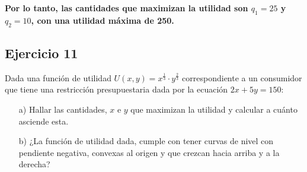 \documentclass{article}
\begin{document}
\textbf{\color{teal}Por lo tanto, las cantidades que maximizan la utilidad son \(q_1 = 25\) y \(q_2 = 10\), con una utilidad máxima de 250.}
\begin{center}
\end{center}


\newpage

\subsection{Ejercicio 11}


Dada una función de utilidad \( U(x, y) = x^{\frac{1}{3}} \cdot y^{\frac{2}{3}} \) correspondiente a un consumidor que tiene una restricción presupuestaria dada por la ecuación \( 2x + 5y = 150 \):

\begin{enumerate}
    \item[a)] Hallar las cantidades, \(x\) e \(y\) que maximizan la utilidad y calcular a cuánto asciende esta.
    \item[b)] ¿La función de utilidad dada, cumple con tener curvas de nivel con pendiente negativa, convexas al origen y que crezcan hacia arriba y a la derecha?
\end{enumerate}
\end{document}
